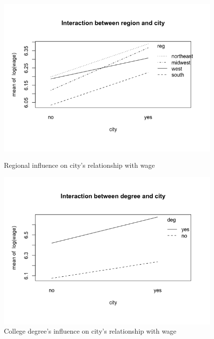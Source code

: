 \documentclass{article}
\begin{document}
      \begin{figure}
        \centering
        \begin{minipage}{.45\textwidth}
          \centering
          \includegraphics[scale=0.35]{interaction/regioncity}
          \caption{Regional influence on city's relationship with wage}
          \label{fig:interactionregioncity}

          \includegraphics[scale=0.35]{interaction/degreecity}
          \caption{College degree's influence on city's relationship with wage}
          \label{fig:interationdegreecity}


\end{minipage}
\end{figure}
\end{document}
